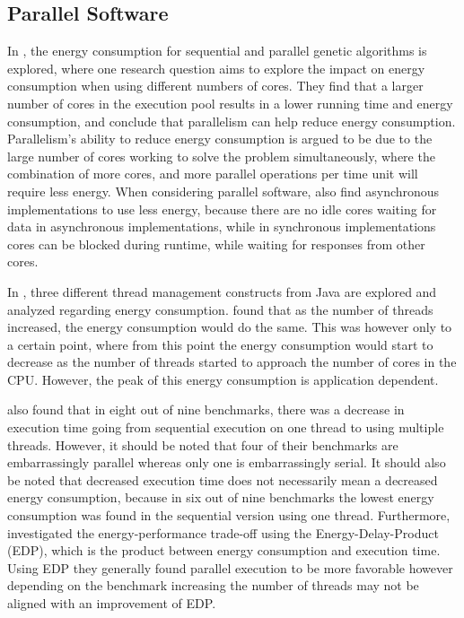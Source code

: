 \subsection{Parallel Software}

In \cite{abdelhafez2019}, the energy consumption for sequential and parallel genetic algorithms is explored, where one research question aims to explore the impact on energy consumption when using different numbers of cores. They find that a larger number of cores in the execution pool results in a lower running time and energy consumption, and conclude that parallelism can help reduce energy consumption. Parallelism's ability to reduce energy consumption is argued to be due to the large number of cores working to solve the problem simultaneously, where the combination of more cores, and more parallel operations per time unit will require less energy. When considering parallel software, \cite{abdelhafez2019} also find asynchronous implementations to use less energy, because there are no idle cores waiting for data in asynchronous implementations, while in synchronous implementations cores can be blocked during runtime, while waiting for responses from other cores. 


In \cite{Pinto2014}, three different thread management constructs from Java are explored and analyzed regarding energy consumption. \cite{Pinto2014} found that as the number of threads increased, the energy consumption would do the same. This was however only to a certain point, where from this point the energy consumption would start to decrease as the number of threads started to approach the number of cores in the CPU. However, the peak of this energy consumption is application dependent.\cite{Pinto2014}

\cite{Pinto2014} also found that in eight out of nine benchmarks, there was a decrease in execution time going from sequential execution on one thread to using multiple threads. However, it should be noted that four of their benchmarks are embarrassingly parallel whereas only one is embarrassingly serial. It should also be noted that decreased execution time does not necessarily mean a decreased energy consumption, because in six out of nine benchmarks the lowest energy consumption was found in the sequential version using one thread. Furthermore, \cite{Pinto2014} investigated the energy-performance trade-off using the Energy-Delay-Product (EDP), which is the product between energy consumption and execution time. Using EDP they generally found parallel execution to be more favorable however depending on the benchmark increasing the number of threads may not be aligned with an improvement of EDP.\cite{Pinto2014}

